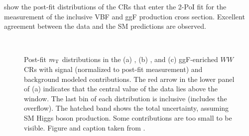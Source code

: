      show the post-fit distributions of the CRs that enter the 2-PoI fit for the measurement of the inclusive VBF and ggF production cross section.
    Excellent agreement between the data and the SM predictions are observed.
    \begin{figure}[htp]
        \centering
         \\
        \caption{
            Post-fit $m_{\text T}$ distributions in the (a) \ZeroJet, (b) \OneJet, and (c) ggF-enriched \TwoJet $WW$ CRs with signal (normalized to post-fit measurement) and background modeled contributions.
            The red arrow in the lower panel of (a) indicates that the central value of the data lies above the window. The last bin of each distribution is inclusive (includes the overflow).
            The hatched band shows the total uncertainty, assuming SM Higgs boson production.
            Some contributions are too small to be visible.
            Figure and caption taken from .
            \label{fig:WW_CRs}
        }
    \end{figure}
